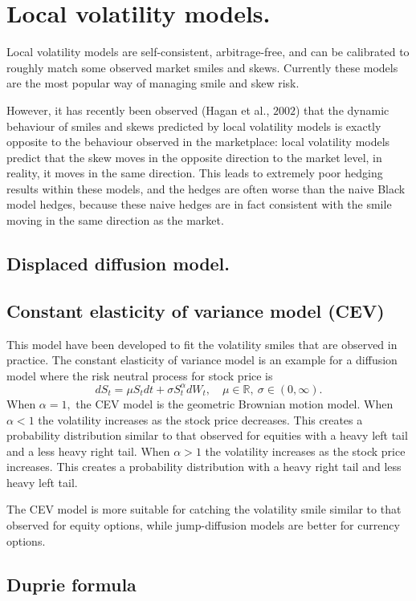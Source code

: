 \documentclass{book}
\begin{document}
\chapter{Local volatility models.}
Local volatility models are self-consistent, arbitrage-free, and can be calibrated to
roughly match some observed market smiles and skews. Currently these models are the most popular way of managing smile and skew risk.

However, it has recently been observed (Hagan et al., $2002$) that the dynamic behaviour of smiles and skews predicted by local volatility models is
exactly opposite to the behaviour observed in the marketplace: local volatility models predict that the skew moves in the opposite direction to the market level, in reality, it moves in the same direction. This leads to extremely poor hedging results within these models, and the hedges are often worse than the naive Black model hedges, because these naive hedges are in fact consistent with the smile moving in the same direction as the market.
\section{Displaced diffusion model.}
\section{Constant elasticity of variance model (CEV)}
This model have been developed to fit the volatility smiles that are observed in practice.
The constant elasticity of variance model is an example for a diffusion model where the risk neutral process for stock price is
$$
dS_{t}=\mu S_{t}dt+\sigma S_{t}^{\alpha}dW_{t},\quad\mu\in\mathbb{R},\ \sigma\in(0,\infty).
$$
When $\alpha=1,$ the CEV model is the geometric Brownian motion model. When $\alpha<1$ the volatility increases as the stock price decreases. This creates a probability distribution similar to that observed for equities with a heavy left tail and a less heavy right tail. When $\alpha>1$ the volatility increases as the stock price increases. This creates a probability distribution with a heavy right tail and less heavy left tail. 

The CEV model is more suitable for catching the volatility smile similar to that observed for equity options, while jump-diffusion models are better for currency options.
\section{Duprie formula}
\end{document}

